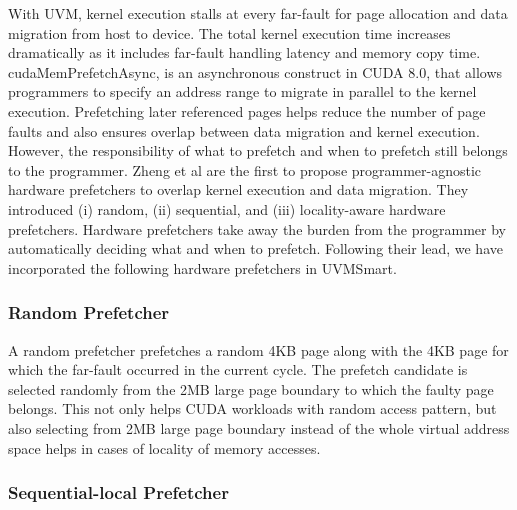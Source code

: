 With UVM, kernel execution stalls at every far-fault for page allocation and data migration from host to device. The total kernel execution time increases dramatically as it includes far-fault handling latency and memory copy time. cudaMemPrefetchAsync, is an asynchronous construct in CUDA 8.0, that allows programmers to specify an address range to migrate in parallel to the kernel execution. Prefetching later referenced pages helps reduce the number of page faults and also ensures overlap between data migration and kernel execution. However, the responsibility of what to prefetch and when to prefetch still belongs to the programmer. Zheng et al are the first to propose programmer-agnostic hardware prefetchers to overlap kernel execution and data migration. They introduced (i) random, (ii) sequential, and (iii) locality-aware hardware prefetchers. Hardware prefetchers take away the burden from the programmer by automatically deciding what and when to prefetch. Following their lead, we have incorporated the following hardware prefetchers in UVMSmart.


\subsubsection{Random Prefetcher}

A random prefetcher prefetches a random 4KB page along with the 4KB page for which the far-fault occurred in the current cycle. The prefetch candidate is selected randomly from the 2MB large page boundary to which the faulty page belongs. This not only helps CUDA workloads with random access pattern, but also selecting from 2MB large page boundary instead of the whole virtual address space helps in cases of locality of memory accesses.

\subsubsection{Sequential-local Prefetcher}

